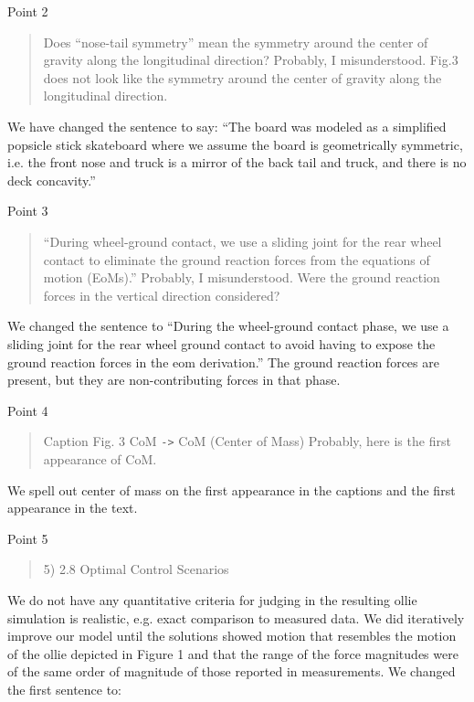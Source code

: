 \documentclass{letter}
\begin{document}
\begin{letter}{}
Point 2

\begin{quote}
    Does ``nose-tail symmetry'' mean the symmetry around the center of gravity along the longitudinal direction? Probably, I misunderstood. Fig.3 does not look like the symmetry around the center of gravity along the longitudinal direction.
\end{quote}

We have changed the sentence to say: ``The board was modeled as a simplified popsicle stick skateboard where we assume the board is geometrically symmetric, i.e. the front nose and truck is a mirror of the back tail and truck, and there is no deck concavity.''

Point 3

\begin{quote}
    “During wheel-ground contact, we use a sliding joint for the rear wheel contact to eliminate the ground reaction forces from the equations of motion (EoMs).” Probably, I misunderstood. Were the ground reaction forces in the vertical direction considered?
\end{quote}

We changed the sentence to ``During the wheel-ground contact phase, we use a sliding joint for the rear wheel ground contact to avoid having to expose the ground reaction forces in the eom derivation.'' The ground reaction forces are present, but they are non-contributing forces in that phase.

Point 4

\begin{quote}
    Caption Fig. 3 CoM \verb|->| CoM (Center of Mass) Probably, here is the first appearance of CoM.
\end{quote}

We spell out center of mass on the first appearance in the captions and the first appearance in the text.

Point 5

\begin{quote}
    5) 2.8 Optimal Control Scenarios
\end{quote}

We do not have any quantitative criteria for judging in the resulting ollie simulation is realistic, e.g. exact comparison to measured data. We did iteratively improve our model until the solutions showed motion that resembles the motion of the ollie depicted in Figure 1 and that the range of the force magnitudes were of the same order of magnitude of those reported in measurements. We changed the first sentence to:


\end{letter}
\end{document}
